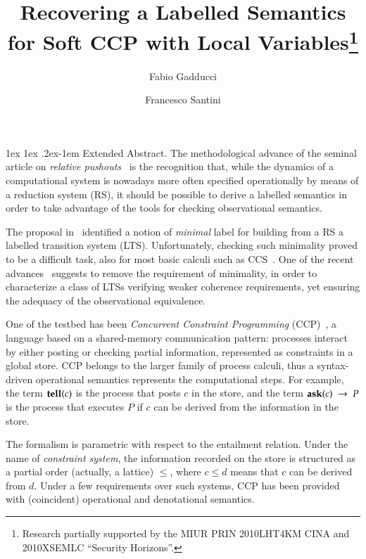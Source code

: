 \documentclass[submission,copyright,creativecommons]{eptcs}
\title{Recovering a Labelled Semantics\\ for Soft CCP with Local Variables\thanks{Research 
		partially supported 
		by the MIUR PRIN 2010LHT4KM CINA
		and 2010XSEMLC ``Security Horizons''.
	}
}
\author{Fabio Gadducci
	\institute{Dipartimento di Informatica, \\ Universit\`a di Pisa, Italy}
	\email{gadducci@di.unipi.it}
	\and
	Francesco Santini
	\institute{IIT-CNR, \\
		Pisa, Italy}
	\email{\quad francesco.santini@iit.cnr.it}
}
\makeatletter
\renewcommand{\paragraph}{%
	\@startsection{paragraph}{4}%
	{\z@}{1ex \@plus 1ex \@minus .2ex}{-1em}%
	{\normalfont\normalsize\bfseries}%
}
\makeatother
\begin{document}

\maketitle


\paragraph{Extended Abstract.}
The methodological advance of the seminal article on \emph{relative pushouts}~\cite{Leifer:00:CONCUR} is the recognition that, 
while the dynamics of a computational system is nowadays more often specified operationally by means of a reduction system (RS), it should be possible to derive a labelled semantics in order to take advantage of the tools for checking observational semantics.

The proposal in~\cite{Leifer:00:CONCUR} identified a notion of \emph{minimal} label for building from a RS a labelled transition system (LTS). Unfortunately, checking such minimality proved to be a difficult task, also for most basic calculi such as CCS~\cite{BonchiGK09, Milner06}.
%
 One of the recent advances~\cite{BonchiGM14} suggests to remove the requirement of minimality, in order to characterize a class of LTSs verifying weaker coherence requirements, yet ensuring the adequacy of the observational equivalence.

One of the testbed has been \emph{Concurrent Constraint Programming} (CCP)~\cite{popl91},  a language based on a shared-memory communication pattern: processes interact by either posting or checking partial information, represented as constraints in a global store. 
%
CCP belongs to the larger family of process calculi, thus a syntax-driven operational semantics 
represents the computational steps. For example, the term ${\bf tell}(c)$ is the process that posts $c$ in the store, 
and the term ${\bf ask}(c) \ \rightarrow \ P$ is the process that executes $P$ if $c$ can be derived from the information 
in the store. 

The formalism is parametric with respect to the entailment relation. Under the name of \emph{constraint system}, 
the information recorded on the store is structured as a partial order (actually, a lattice) $\leq$, where $c\leq d$ means that $c$ can be derived from $d$.
%
Under a few requirements over such systems, CCP has been provided with (coincident) operational and denotational semantics. 
\end{document}
